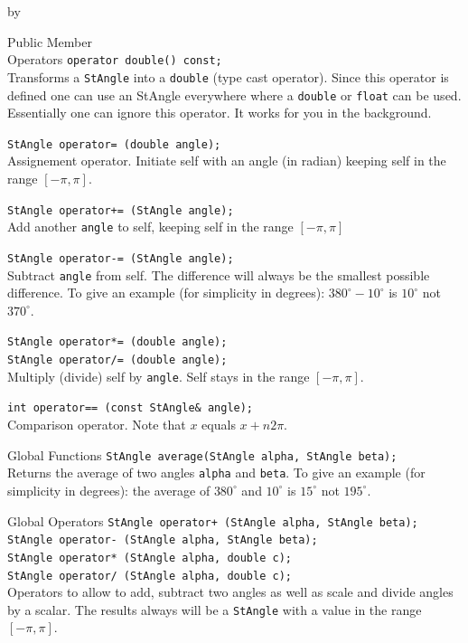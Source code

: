 \documentclass[twoside]{article}
\newcommand{\entrylabel}[1]{\mbox{\textbf{{#1}}}\hfil}%
\newenvironment{entry}
{\begin{list}{}%
    {\renewcommand{\makelabel}{\entrylabel}%
     \setlength{\labelwidth}{90pt}%
     \setlength{\leftmargin}{\labelwidth}
     \advance\leftmargin by \labelsep%
      }%
    }%
  {\end{list}}
\newcommand{\Entrylabel}[1]%
{\raisebox{0pt}[1ex][0pt]{\makebox[\labelwidth][l]%
    {\parbox[t]{\labelwidth}{\hspace{0pt}\textbf{{#1}}}}}}
\newenvironment{Entry}%
{\renewcommand{\entrylabel}{\Entrylabel}\begin{entry}}%
  {\end{entry}}
\begin{document}
\begin{Entry}
\item[Public Member\\ Operators]
    \verb+operator double() const;+\\
    Transforms a \texttt{StAngle} into a \texttt{double} (type cast operator).
    Since this operator is defined one can use an StAngle everywhere where a
    \texttt{double} or \texttt{float} can be used.
    Essentially one can ignore this operator. It works for you in the background.

    \verb+StAngle operator= (double angle);+\\
    Assignement operator. Initiate self with an angle (in radian)
    keeping self in the range $[-\pi, \pi]$.

    \verb#StAngle operator+= (StAngle angle);#\\
    Add another \texttt{angle} to self, keeping self in the range $[-\pi, \pi]$

    \verb+StAngle operator-= (StAngle angle);+\\
    Subtract \texttt{angle} from self. The difference will always be the
    smallest possible difference. To give an example (for simplicity in degrees):
    $380^\circ - 10^\circ$ is $10^\circ$ not $370^\circ$.

    \verb+StAngle operator*= (double angle);+\\
    \verb+StAngle operator/= (double angle);+\\
    Multiply (divide) self by \texttt{angle}. Self stays in the range $[-\pi, \pi]$.
  
    \verb+int operator== (const StAngle& angle);+\\
    Comparison operator. Note that $x$ equals $x + n 2 \pi$.

\item[Global Functions]
    \verb+StAngle average(StAngle alpha, StAngle beta);+\\
    Returns the average of two angles \texttt{alpha} and \texttt{beta}.
    To give an example (for simplicity in degrees):
    the average of $380^\circ$ and $10^\circ$ is $15^\circ$ not $195^\circ$.    
    
\item[Global Operators]
    \verb#StAngle operator+ (StAngle alpha, StAngle beta);#\\
    \verb+StAngle operator- (StAngle alpha, StAngle beta);+\\
    \verb+StAngle operator* (StAngle alpha, double c);+\\
    \verb+StAngle operator/ (StAngle alpha, double c);+\\
    Operators to allow to add, subtract two angles as well as
    scale and divide angles by a scalar. The results always will
    be a \texttt{StAngle} with a value in the range $[-\pi, \pi]$.
    

\end{Entry}
\end{document}
